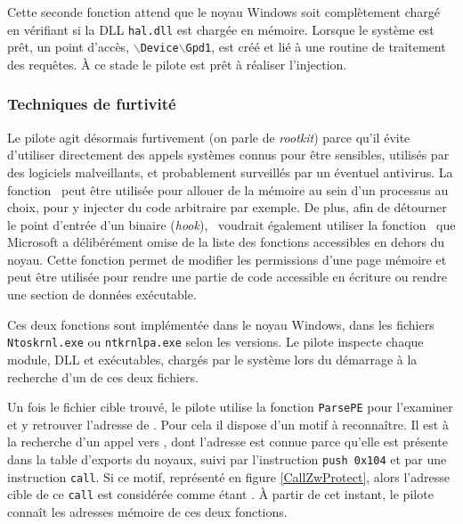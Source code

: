Cette seconde fonction attend que le noyau Windows soit complètement chargé en vérifiant si la DLL \texttt{hal.dll} est chargée en mémoire. Lorsque le système est prêt, un point d'accès, $\backslash$\texttt{Device}$\backslash$\texttt{Gpd1}, est créé et lié à une routine de traitement des requêtes. 
À ce stade le pilote est prêt à réaliser l'injection.

\subsubsection{Techniques de furtivité}
Le pilote agit désormais furtivement (on parle de \emph{rootkit}) parce qu'il évite d'utiliser directement des appels systèmes connus pour être sensibles, utilisés par des logiciels malveillants, et probablement surveillés par un éventuel antivirus.
La fonction \ZwA\ peut être utilisée pour allouer de la mémoire au sein d'un processus au choix, pour y injecter du code arbitraire par exemple.
De plus, afin de détourner le point d'entrée d'un binaire (\emph{hook}), \duqu\ voudrait également utiliser la fonction \ZwP\ que Microsoft a délibérément omise de la liste des fonctions accessibles en dehors du noyau. Cette fonction permet de modifier les permissions d'une page mémoire et peut être utilisée pour rendre une partie de code accessible en écriture ou rendre une section de données exécutable.

Ces deux fonctions sont implémentée dans le noyau Windows, dans les fichiers \texttt{Ntoskrnl.exe} ou \texttt{ntkrnlpa.exe} selon les versions. 
Le pilote inspecte chaque module, DLL et exécutables, chargés par le système lors du démarrage à la recherche d'un de ces deux fichiers.

Un fois le fichier cible trouvé, le pilote utilise la fonction \texttt{ParsePE} pour l'examiner et y retrouver l'adresse de \ZwP.
Pour cela il dispose d'un motif à reconnaître.
Il est à la recherche d'un appel vers \ZwA, dont l'adresse est connue parce qu'elle est présente dans la table d'exports du noyaux, suivi par l'instruction \texttt{push 0x104} et par une instruction \texttt{call}.
Si ce motif, représenté en figure \ref{CallZwProtect}, alors l'adresse cible de ce \texttt{call} est considérée comme étant \ZwP.
À partir de cet instant, le pilote connaît les adresses mémoire de ces deux fonctions.

